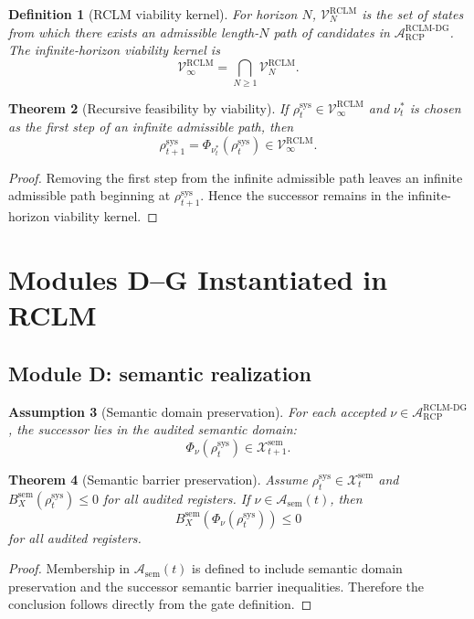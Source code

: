 \documentclass[11pt,a4paper]{article}
\newtheorem{theorem}{Theorem}[section]
\newtheorem{definition}[theorem]{Definition}
\newtheorem{assumption}[theorem]{Assumption}
\newcommand{\Acal}{\mathcal A}
\newcommand{\Vcal}{\mathcal V}
\newcommand{\Xcal}{\mathcal X}
\newcommand{\RCP}{\mathrm{RCP}}
\newcommand{\RCLM}{\mathrm{RCLM}}
\newcommand{\DG}{\mathrm{DG}}
\newcommand{\sem}{\mathrm{sem}}
\newcommand{\sys}{\mathrm{sys}}
\begin{document}
\begin{definition}[RCLM viability kernel]
For horizon \(N\), \(\Vcal_N^{\RCLM}\) is the set of states from which there exists an admissible length-\(N\) path of candidates in \(\Acal_{\RCP}^{\RCLM\text{-}\DG}\). The infinite-horizon viability kernel is
\[
\Vcal_\infty^{\RCLM}=\bigcap_{N\ge1}\Vcal_N^{\RCLM}.
\]
\end{definition}

\begin{theorem}[Recursive feasibility by viability]
If \(\rho_t^{\sys}\in\Vcal_\infty^{\RCLM}\) and \(\nu_t^*\) is chosen as the first step of an infinite admissible path, then
\[
\rho_{t+1}^{\sys}=\Phi_{\nu_t^*}(\rho_t^{\sys})\in\Vcal_\infty^{\RCLM}.
\]
\end{theorem}

\begin{proof}
Removing the first step from the infinite admissible path leaves an infinite admissible path beginning at \(\rho_{t+1}^{\sys}\). Hence the successor remains in the infinite-horizon viability kernel.
\end{proof}

\section{Modules D--G Instantiated in RCLM}

\subsection{Module D: semantic realization}

\begin{assumption}[Semantic domain preservation]
For each accepted \(\nu\in\Acal_{\RCP}^{\RCLM\text{-}\DG}\), the successor lies in the audited semantic domain:
\[
\Phi_\nu(\rho_t^{\sys})\in\Xcal_{t+1}^{\sem}.
\]
\end{assumption}

\begin{theorem}[Semantic barrier preservation]
Assume \(\rho_t^{\sys}\in\Xcal_t^{\sem}\) and \(B_X^{\sem}(\rho_t^{\sys})\le0\) for all audited registers. If \(\nu\in\Acal_{\sem}(t)\), then
\[
B_X^{\sem}(\Phi_\nu(\rho_t^{\sys}))\le0
\]
for all audited registers.
\end{theorem}

\begin{proof}
Membership in \(\Acal_{\sem}(t)\) is defined to include semantic domain preservation and the successor semantic barrier inequalities. Therefore the conclusion follows directly from the gate definition.
\end{proof}
\end{document}
